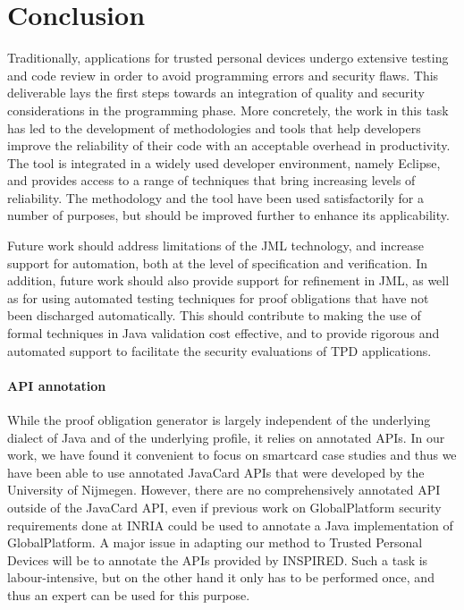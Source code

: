 

\section{Conclusion} 

Traditionally, applications for trusted personal devices undergo
extensive testing and code review in order to avoid programming errors
and security flaws. This deliverable lays the first steps towards an
integration of quality and security considerations in the programming
phase. More concretely, the work in this task has led to the
development of methodologies and tools that help developers improve
the reliability of their code with an acceptable overhead in
productivity. The tool is integrated in a widely used developer
environment, namely Eclipse, and provides access to a range of
techniques that bring increasing levels of reliability.  The
methodology and the tool have been used satisfactorily for a number of
purposes, but should be improved further to enhance its applicability.


Future work should address limitations of the JML technology, and
increase support for automation, both at the level of specification
and verification. In addition, future work should also provide support
for refinement in JML, as well as for using automated testing
techniques for proof obligations that have not been discharged
automatically. This should contribute to making the use of formal
techniques in Java validation cost effective, and to provide rigorous
and automated support to facilitate the security evaluations of TPD
applications.


\paragraph{API annotation}
While the proof obligation generator is largely independent of the
underlying dialect of Java and of the underlying profile, it relies on
annotated APIs. In our work, we have found it convenient to focus on
smartcard case studies and thus we have been able to use annotated
JavaCard APIs that were developed by the University of Nijmegen.
However, there are no comprehensively annotated API outside of the
Java\-Card API, even if previous work on GlobalPlatform security
requirements done at INRIA could be used to annotate a Java
implementation of GlobalPlatform. A major issue in adapting our method
to Trusted Personal Devices will be to annotate the APIs provided by
INSPIRED. Such a task is labour-intensive, but on the other hand it
only has to be performed once, and thus an expert can be used for this
purpose.

